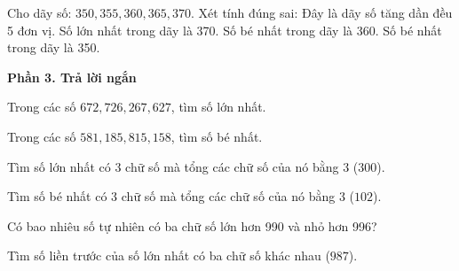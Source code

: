 \begin{ex} %
Cho dãy số: $350, 355, 360, 365, 370$. Xét tính đúng sai:
\choiceTF
{\True Đây là dãy số tăng dần đều 5 đơn vị.}
{\True Số lớn nhất trong dãy là 370.}
{Số bé nhất trong dãy là 360.}
{\True Số bé nhất trong dãy là 350.}
\end{ex}

\textbf{Phần 3. Trả lời ngắn}

\begin{ex} %
Trong các số $672, 726, 267, 627$, tìm số lớn nhất.
\end{ex}

\begin{ex} %
Trong các số $581, 185, 815, 158$, tìm số bé nhất.
\end{ex}

\begin{ex} %
Tìm số lớn nhất có 3 chữ số mà tổng các chữ số của nó bằng 3 ($300$).
\end{ex}

\begin{ex} %
Tìm số bé nhất có 3 chữ số mà tổng các chữ số của nó bằng 3 ($102$).
\end{ex}

\begin{ex} %
Có bao nhiêu số tự nhiên có ba chữ số lớn hơn 990 và nhỏ hơn 996?
\end{ex}

\begin{ex} %
Tìm số liền trước của số lớn nhất có ba chữ số khác nhau ($987$).
\end{ex}
